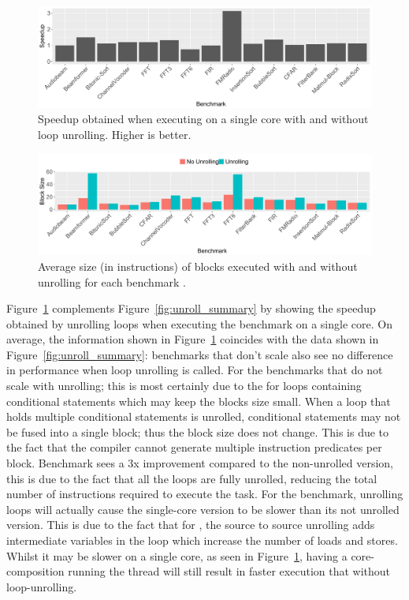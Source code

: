 \begin{figure}[t]
  \includegraphics[width=1\textwidth]{streamit-paper/graphics/unroll_speed_bars.pdf}
  \caption{Speedup obtained when executing on a single core with and without loop unrolling. Higher is better.}\label{fig:unroll_bars}
\end{figure}
\begin{figure}[t]
  \includegraphics[width=1\textwidth]{streamit-paper/graphics/unrolling_size.pdf}
  \caption{Average size (in instructions) of blocks executed with and without unrolling for each benchmark .}\label{fig:unroll_size}
\end{figure}


Figure~\ref{fig:unroll_bars} complements Figure~\ref{fig:unroll_summary} by showing the speedup obtained by unrolling loops when executing the benchmark on a single core.
On average, the information shown in Figure~\ref{fig:unroll_bars} coincides with the data shown in Figure~\ref{fig:unroll_summary}: benchmarks that don't scale also see no difference in performance when loop unrolling is called.
For the benchmarks that do not scale with unrolling; this is most certainly due to the for loops containing conditional statements which may keep the blocks size small.
When a loop that holds multiple conditional statements is unrolled, conditional statements may not be fused into a single block; thus the block size does not change.
This is due to the fact that the compiler cannot generate multiple instruction predicates per block.
Benchmark  sees a 3x improvement compared to the non-unrolled version, this is due to the fact that all the loops are fully unrolled, reducing the total number of instructions required to execute the task.
For the  benchmark, unrolling loops will actually cause the single-core version to be slower than its not unrolled version.
This is due to the fact that for , the source to source unrolling adds intermediate variables in the loop which increase the number of loads and stores.
Whilst it may be slower on a single core, as seen in Figure~\ref{fig:unroll_bars}, having a core-composition running the thread will still result in faster execution that without loop-unrolling.

